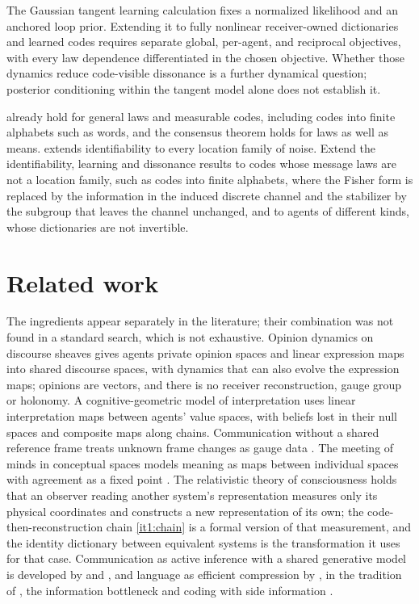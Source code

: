 \documentclass[11pt,letterpaper]{report}
\begin{document}
The Gaussian tangent learning calculation fixes a normalized likelihood and an anchored loop prior. Extending it to fully nonlinear receiver-owned dictionaries and learned codes requires separate global, per-agent, and reciprocal objectives, with every law dependence differentiated in the chosen objective. Whether those dynamics reduce code-visible dissonance is a further dynamical question; posterior conditioning within the tangent model alone does not establish it.

 already hold for general laws and measurable codes, including codes into finite alphabets such as words, and the consensus theorem holds for laws as well as means.  extends identifiability to every location family of noise. Extend the identifiability, learning and dissonance results to codes whose message laws are not a location family, such as codes into finite alphabets, where the Fisher form is replaced by the information in the induced discrete channel and the stabilizer by the subgroup that leaves the channel unchanged, and to agents of different kinds, whose dictionaries are not invertible.

\section*{Related work}
The ingredients appear separately in the literature; their combination was not found in a standard search, which is not exhaustive. Opinion dynamics on discourse sheaves \citep{HansenGhrist2021} gives agents private opinion spaces and linear expression maps into shared discourse spaces, with dynamics that can also evolve the expression maps; opinions are vectors, and there is no receiver reconstruction, gauge group or holonomy. A cognitive-geometric model of interpretation \citep{Amornbunchornvej2025} uses linear interpretation maps between agents' value spaces, with beliefs lost in their null spaces and composite maps along chains. Communication without a shared reference frame treats unknown frame changes as gauge data \citep{BartlettRudolphSpekkens2007,vanEnk2006}. The meeting of minds in conceptual spaces models meaning as maps between individual spaces with agreement as a fixed point \citep{WarglienGardenfors2013}. The relativistic theory of consciousness \citep{LahavNeemeh2022} holds that an observer reading another system's representation measures only its physical coordinates and constructs a new representation of its own; the code-then-reconstruction chain \cref{it1:chain} is a formal version of that measurement, and the identity dictionary between equivalent systems is the transformation it uses for that case. Communication as active inference with a shared generative model is developed by \citet{FristonFrith2015} and \citet{FristonEtAl2020Language}, and language as efficient compression by \citet{ZaslavskyEtAl2018}, in the tradition of \citet{Shannon1948}, the information bottleneck \citep{Tishby1999} and coding with side information \citep{WynerZiv1976}.

\begingroup
\small
\setlength{\bibsep}{3pt}


\endgroup
\end{document}
